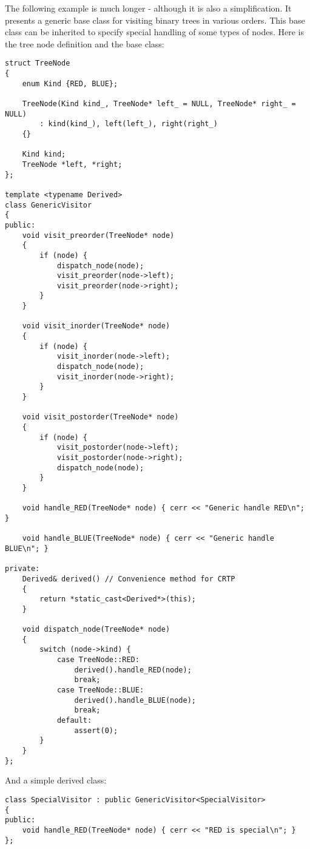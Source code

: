 \documentclass{book}
\begin{document}
The following example is much longer - although it is also a simplification. It presents a generic base class for visiting binary trees in various orders. 
This base class can be inherited to specify special handling of some types of nodes. 
Here is the tree node definition and the base class:
\begin{lstlisting}
struct TreeNode
{
    enum Kind {RED, BLUE};

    TreeNode(Kind kind_, TreeNode* left_ = NULL, TreeNode* right_ = NULL)
        : kind(kind_), left(left_), right(right_)
    {}

    Kind kind;
    TreeNode *left, *right;
};

template <typename Derived>
class GenericVisitor
{
public:
    void visit_preorder(TreeNode* node)
    {
        if (node) {
            dispatch_node(node);
            visit_preorder(node->left);
            visit_preorder(node->right);
        }
    }

    void visit_inorder(TreeNode* node)
    {
        if (node) {
            visit_inorder(node->left);
            dispatch_node(node);
            visit_inorder(node->right);
        }
    }

    void visit_postorder(TreeNode* node)
    {
        if (node) {
            visit_postorder(node->left);
            visit_postorder(node->right);
            dispatch_node(node);
        }
    }

    void handle_RED(TreeNode* node) { cerr << "Generic handle RED\n"; }

    void handle_BLUE(TreeNode* node) { cerr << "Generic handle BLUE\n"; }

private:
    Derived& derived() // Convenience method for CRTP
    {
        return *static_cast<Derived*>(this);
    }

    void dispatch_node(TreeNode* node)
    {
        switch (node->kind) {
            case TreeNode::RED:
                derived().handle_RED(node);
                break;
            case TreeNode::BLUE:
                derived().handle_BLUE(node);
                break;
            default:
                assert(0);
        }
    }
};
\end{lstlisting}

And a simple derived class:

\begin{lstlisting}
class SpecialVisitor : public GenericVisitor<SpecialVisitor>
{
public:
    void handle_RED(TreeNode* node) { cerr << "RED is special\n"; }
};
\end{lstlisting}
\end{document}
